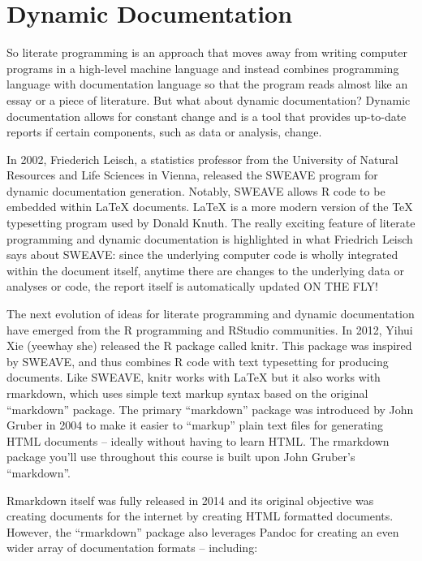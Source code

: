 \documentclass[
]{book}
\begin{document}
\hypertarget{dynamic-documentation}{%
\section{Dynamic Documentation}\label{dynamic-documentation}}

So literate programming is an approach that moves away from writing computer programs in a high-level machine language and instead combines programming language with documentation language so that the program reads almost like an essay or a piece of literature. But what about dynamic documentation? Dynamic documentation allows for constant change and is a tool that provides up-to-date reports if certain components, such as data or analysis, change.

In 2002, Friederich Leisch, a statistics professor from the University of Natural Resources and Life Sciences in Vienna, released the SWEAVE program for dynamic documentation generation. Notably, SWEAVE allows R code to be embedded within LaTeX documents. LaTeX is a more modern version of the TeX typesetting program used by Donald Knuth. The really exciting feature of literate programming and dynamic documentation is highlighted in what Friedrich Leisch says about SWEAVE: since the underlying computer code is wholly integrated within the document itself, anytime there are changes to the underlying data or analyses or code, the report itself is automatically updated ON THE FLY!

The next evolution of ideas for literate programming and dynamic documentation have emerged from the R programming and RStudio communities. In 2012, Yihui Xie (yeewhay she) released the R package called knitr. This package was inspired by SWEAVE, and thus combines R code with text typesetting for producing documents. Like SWEAVE, knitr works with LaTeX but it also works with rmarkdown, which uses simple text markup syntax based on the original ``markdown'' package. The primary ``markdown'' package was introduced by John Gruber in 2004 to make it easier to ``markup'' plain text files for generating HTML documents -- ideally without having to learn HTML. The rmarkdown package you'll use throughout this course is built upon John Gruber's ``markdown''.

Rmarkdown itself was fully released in 2014 and its original objective was creating documents for the internet by creating HTML formatted documents. However, the ``rmarkdown'' package also leverages Pandoc for creating an even wider array of documentation formats -- including:
\end{document}
